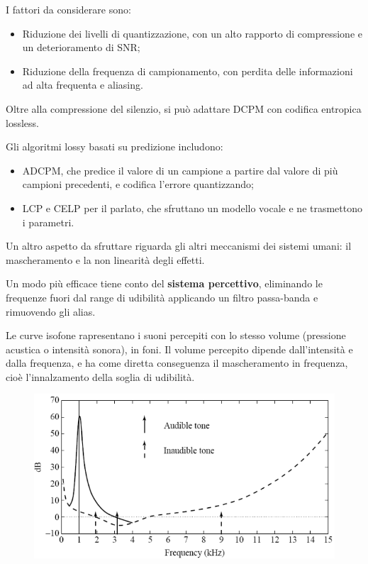  I fattori da considerare sono:
 \begin{itemize}
 	\item Riduzione dei livelli di quantizzazione, con un alto rapporto di compressione e un deterioramento di SNR;
 	\item Riduzione della frequenza di campionamento, con perdita delle informazioni ad alta frequenta e aliasing.
 \end{itemize}

Oltre alla compressione del silenzio, si può adattare DCPM con codifica entropica lossless.

Gli algoritmi lossy basati su predizione includono:
\begin{itemize}
	\item ADCPM, che predice il valore di un campione a partire dal valore di più campioni precedenti, e codifica l'errore quantizzando;
	\item LCP e CELP per il parlato, che sfruttano un modello vocale e ne trasmettono i parametri.
\end{itemize}

Un altro aspetto da sfruttare riguarda gli altri meccanismi dei sistemi umani: il mascheramento e la non linearità degli effetti. 
 
Un modo più efficace tiene conto del \textbf{sistema percettivo}, eliminando le frequenze fuori dal range di udibilità applicando un filtro passa-banda e rimuovendo gli alias. 

Le curve isofone rapresentano i suoni percepiti con lo stesso volume (pressione acustica o intensità sonora), in foni. Il volume percepito dipende dall'intensità e dalla frequenza, e ha come diretta conseguenza il mascheramento in frequenza, cioè l'innalzamento della soglia di udibilità.

\begin{figure}[h]
	\centering
	\includegraphics[scale=0.6]{Lezioni/Immagini/mascheramento}
\end{figure}
 
